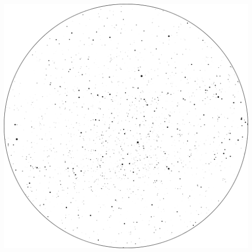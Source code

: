 \documentclass{SAS-class-skygen}
\begin{document}
	\vspace{0.5cm}
    \begin{center}
    \includegraphics[width=\textwidth]{./pics/sky_chart1.png}
    \end{center}
    
    
\end{document}
